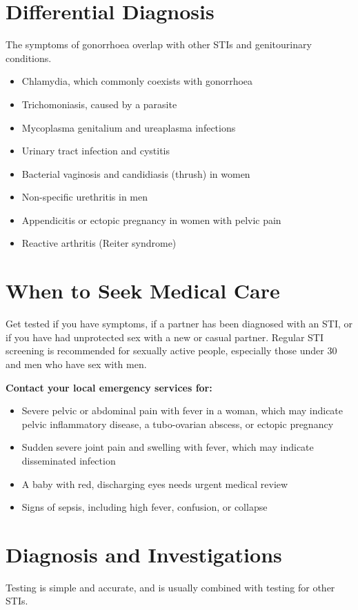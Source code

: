 \section*{Differential Diagnosis}
The symptoms of gonorrhoea overlap with other STIs and genitourinary conditions.

\begin{itemize}
    \item Chlamydia, which commonly coexists with gonorrhoea
    \item Trichomoniasis, caused by a parasite
    \item Mycoplasma genitalium and ureaplasma infections
    \item Urinary tract infection and cystitis
    \item Bacterial vaginosis and candidiasis (thrush) in women
    \item Non-specific urethritis in men
    \item Appendicitis or ectopic pregnancy in women with pelvic pain
    \item Reactive arthritis (Reiter syndrome)
\end{itemize}

\section*{When to Seek Medical Care}
Get tested if you have symptoms, if a partner has been diagnosed with an STI, or if you have had unprotected sex with a new or casual partner. Regular STI screening is recommended for sexually active people, especially those under 30 and men who have sex with men.

\textbf{Contact your local emergency services for:}
\begin{itemize}
    \item Severe pelvic or abdominal pain with fever in a woman, which may indicate pelvic inflammatory disease, a tubo-ovarian abscess, or ectopic pregnancy
    \item Sudden severe joint pain and swelling with fever, which may indicate disseminated infection
    \item A baby with red, discharging eyes needs urgent medical review
    \item Signs of sepsis, including high fever, confusion, or collapse
\end{itemize}

\section*{Diagnosis and Investigations}
Testing is simple and accurate, and is usually combined with testing for other STIs.

